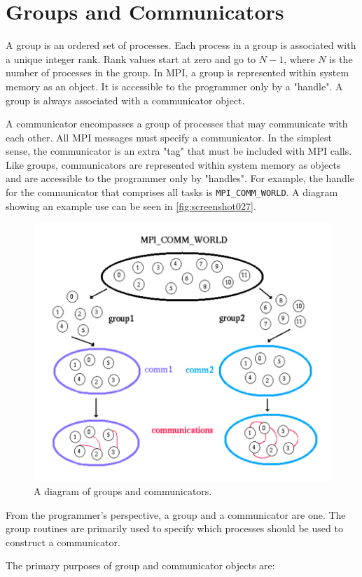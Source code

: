 \section{Groups and Communicators}
A group is an ordered set of processes. Each process in a group is associated with a unique integer rank. Rank values start at zero and go to $N-1$, where $N$ is the number of processes in the group. In MPI, a group is represented within system memory as an object. It is accessible to the programmer only by a "handle". A group is always associated with a communicator object.  

A communicator encompasses a group of processes that may communicate with each other. All MPI messages must specify a communicator. In the simplest sense, the communicator is an  extra  "tag"  that  must  be  included  with  MPI  calls.  Like  groups,  communicators  are represented within system memory as objects and are accessible to the programmer only by "handles".  For  example,  the  handle  for  the  communicator  that  comprises  all  tasks  is \texttt{MPI\_COMM\_WORLD}.  A diagram showing an example use can be seen in \autoref{fig:screenshot027}.

\begin{figure}
\centering
\includegraphics[width=0.7\linewidth]{figures/screenshot027}
\caption{A diagram of groups and communicators.}
\label{fig:screenshot027}
\end{figure}

From  the  programmer's  perspective,  a  group  and  a  communicator  are  one.  The  group routines  are  primarily  used  to  specify  which  processes  should  be  used  to  construct  a communicator.  

The primary purposes of group and communicator objects are:

